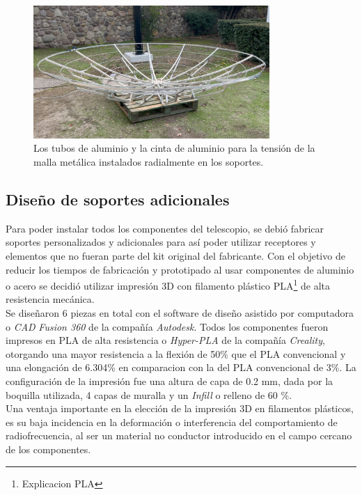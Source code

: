 \begin{figure}
    \centering
    \includegraphics[width=0.8\textwidth]{img/estructura2}
    \caption{Los tubos de aluminio y la cinta de aluminio para la tensión de la malla metálica instalados radialmente en los soportes.}
    \label{fig:ensamble3}
\end{figure}

\subsection{Diseño de soportes adicionales}

Para poder instalar todos los componentes del telescopio, se debió fabricar soportes personalizados y adicionales para así poder utilizar receptores y elementos que no fueran parte del kit original del fabricante. Con el objetivo de reducir los tiempos de fabricación y prototipado al usar componentes de aluminio o acero se decidió utilizar impresión 3D con filamento plástico PLA\footnote{Explicacion PLA} de alta resistencia mecánica.\\

Se diseñaron 6 piezas en total con el software de diseño asistido por computadora o \textit{CAD} \textit{Fusion 360} de la compañía \textit{Autodesk}. Todos los componentes fueron impresos en PLA de alta resistencia o \textit{Hyper-PLA} de la compañía \textit{Creality}, otorgando una mayor resistencia a la flexión de 50\% que el PLA convencional y una elongación de 6.304\% en comparacion con la del PLA convencional de 3\%. La configuración de la impresión fue una altura de capa de 0.2 mm, dada por la boquilla utilizada, 4 capas de muralla y un \textit{Infill} o relleno de 60 \%.\\

Una ventaja importante en la elección de la impresión 3D en filamentos plásticos, es su baja incidencia en la deformación o interferencia del comportamiento de radiofrecuencia, al ser un material no conductor introducido en el campo cercano de los componentes.\\

